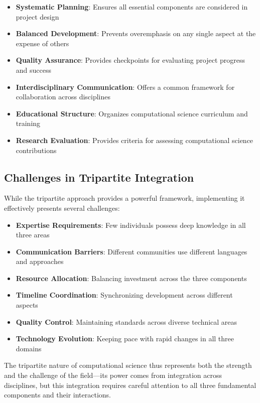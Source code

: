 \begin{itemize}
    \item \textbf{Systematic Planning}: Ensures all essential components are considered in project design
    \item \textbf{Balanced Development}: Prevents overemphasis on any single aspect at the expense of others
    \item \textbf{Quality Assurance}: Provides checkpoints for evaluating project progress and success
    \item \textbf{Interdisciplinary Communication}: Offers a common framework for collaboration across disciplines
    \item \textbf{Educational Structure}: Organizes computational science curriculum and training
    \item \textbf{Research Evaluation}: Provides criteria for assessing computational science contributions
\end{itemize}

\subsection{Challenges in Tripartite Integration}

While the tripartite approach provides a powerful framework, implementing it effectively presents several challenges:

\begin{itemize}
    \item \textbf{Expertise Requirements}: Few individuals possess deep knowledge in all three areas
    \item \textbf{Communication Barriers}: Different communities use different languages and approaches
    \item \textbf{Resource Allocation}: Balancing investment across the three components
    \item \textbf{Timeline Coordination}: Synchronizing development across different aspects
    \item \textbf{Quality Control}: Maintaining standards across diverse technical areas
    \item \textbf{Technology Evolution}: Keeping pace with rapid changes in all three domains
\end{itemize}

The tripartite nature of computational science thus represents both the strength and the challenge of the field—its power comes from integration across disciplines, but this integration requires careful attention to all three fundamental components and their interactions.

